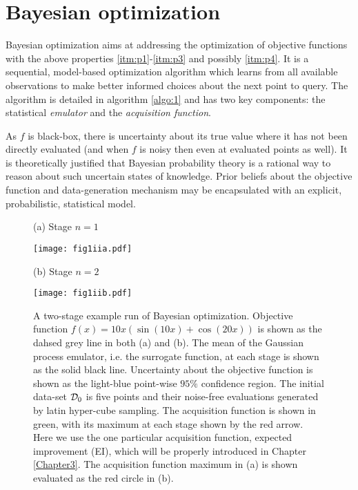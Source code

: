 \newpage

\section{Bayesian optimization} \label{BO}

Bayesian optimization \citep{kushner1964new} \citep{mockus1974bayesian} aims at addressing the optimization of objective functions with the above properties \ref{itm:p1}-\ref{itm:p3} and possibly \ref{itm:p4}. It is a sequential, model-based optimization algorithm which learns from all available observations to make better informed choices about the next point to query. The algorithm is detailed in algorithm \ref{algo:1} and has two key components: the statistical \textit{emulator} and the \emph{acquisition function}. 

As $f$ is black-box, there is uncertainty about its true value where it has not been directly evaluated (and when $f$ is noisy then even at evaluated points as well). It is theoretically justified \citep{cox} that Bayesian probability theory is a rational way to reason about such uncertain states of knowledge. Prior beliefs about the objective function and data-generation mechanism may be encapsulated with an explicit, probabilistic, statistical model. 

\begin{figure}
\begin{flushleft} \hspace{25pt} (a) Stage $n=1$ \end{flushleft}
\texttt{[image: fig1iia.pdf]}
\begin{flushleft} \hspace{25pt} (b) Stage $n=2$ \end{flushleft}
\texttt{[image: fig1iib.pdf]}
\centering
\caption{A two-stage example run of Bayesian optimization. Objective function $f(x) = 10x(\sin(10x) + \cos(20x))$ is shown as the dahsed grey line in both (a) and (b). The mean of the Gaussian process emulator, i.e. the surrogate function, at each stage is shown as the solid black line. Uncertainty about the objective function is shown as the light-blue point-wise $95\%$ confidence region. The initial data-set $\mathcal{D}_0$ is five points and their noise-free evaluations generated by latin hyper-cube sampling. The acquisition function is shown in green, with its maximum at each stage shown by the red arrow. Here we use the one particular acquisition function, expected improvement (EI), which will be properly introduced in Chapter \ref{Chapter3}. The acquisition function maximum in (a) is shown evaluated as the red circle in (b).} \label{fig:1ii}
\end{figure}

